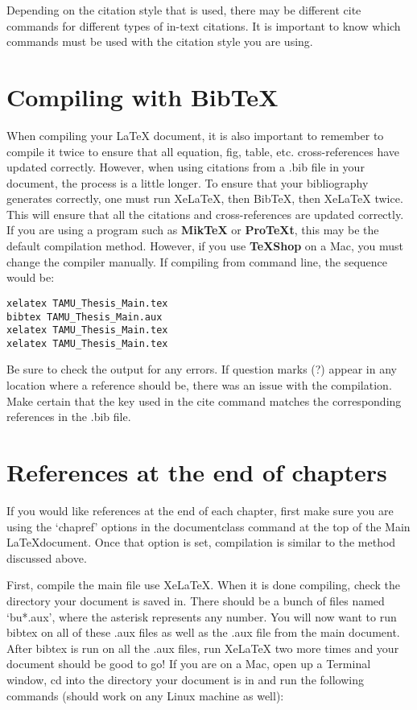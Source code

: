 Depending on the citation style that is used, there may be different cite commands for different types of in-text citations. It is important to know which commands must be used with the citation style you are using.

\section{Compiling with BibTeX}
When compiling your \LaTeX{} document, it is also important to remember to compile it twice to ensure that all equation, fig, table, etc. cross-references have updated correctly. However, when using citations from a .bib file in your document, the process is a little longer. To ensure that your bibliography generates correctly, one must run XeLaTeX, then BibTeX, then XeLaTeX twice. This will ensure that all the citations and cross-references are updated correctly. If you are using a program such as \textbf{MikTeX} or \textbf{ProTeXt}, this may be the default compilation method. However, if you use \textbf{TeXShop} on a Mac, you must change the compiler manually. If compiling from command line, the sequence would be:

{\footnotesize \begin{verbatim}
xelatex TAMU_Thesis_Main.tex
bibtex TAMU_Thesis_Main.aux
xelatex TAMU_Thesis_Main.tex
xelatex TAMU_Thesis_Main.tex
\end{verbatim}}

Be sure to check the output for any errors. If question marks (?) appear in any location where a reference should be, there was an issue with the compilation. Make certain that the key used in the cite command matches the corresponding references in the .bib file.

\section{References at the end of chapters}
If you would like references at the end of each chapter, first make sure you are using the `chapref' options in the documentclass command at the top of the Main \LaTeX document. Once that option is set, compilation is similar to the method discussed above.

First, compile the main file use XeLaTeX. When it is done compiling, check the directory your document is saved in. There should be a bunch of files named `bu*.aux', where the asterisk represents any number. You will now want to run bibtex on all of these .aux files as well as the .aux file from the main document. After bibtex is run on all the .aux files, run XeLaTeX two more times and your document should be good to go! If you are on a Mac, open up a Terminal window, cd into the directory your document is in and run the following commands (should work on any Linux machine as well):

